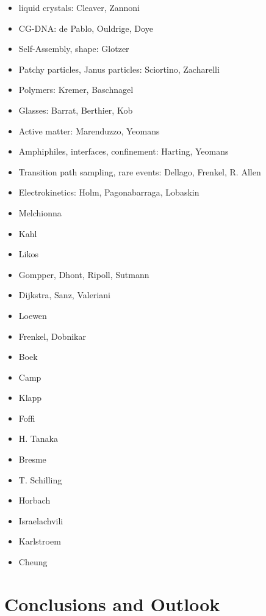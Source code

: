 \documentclass[8.5pt,twoside,twocolumn]{article}
\newcommand{\bit}{\begin{itemize}}
\newcommand{\eit}{\end{itemize}}
\begin{document}
\bit
\item liquid crystals: Cleaver, Zannoni
\item CG-DNA: de Pablo, Ouldrige, Doye 
\item Self-Assembly, shape: Glotzer 
\item Patchy particles, Janus particles: Sciortino, Zacharelli 
\item Polymers: Kremer, Baschnagel
\item Glasses: Barrat, Berthier, Kob 
\item Active matter: Marenduzzo, Yeomans
\item Amphiphiles, interfaces, confinement: Harting, Yeomans 
\item Transition path sampling, rare events: Dellago, Frenkel, R. Allen
\item Electrokinetics: Holm, Pagonabarraga, Lobaskin
\item Melchionna
\item Kahl
\item Likos
\item Gompper, Dhont, Ripoll, Sutmann
\item Dijkstra, Sanz, Valeriani
\item Loewen
\item Frenkel, Dobnikar
\item Boek
\item Camp
\item Klapp
\item Foffi
\item H. Tanaka
\item Bresme
\item T. Schilling
\item Horbach
\item Israelachvili
\item Karlstroem
\item Cheung
\eit

\section{Conclusions and Outlook}



\footnotesize{
}
\end{document}

